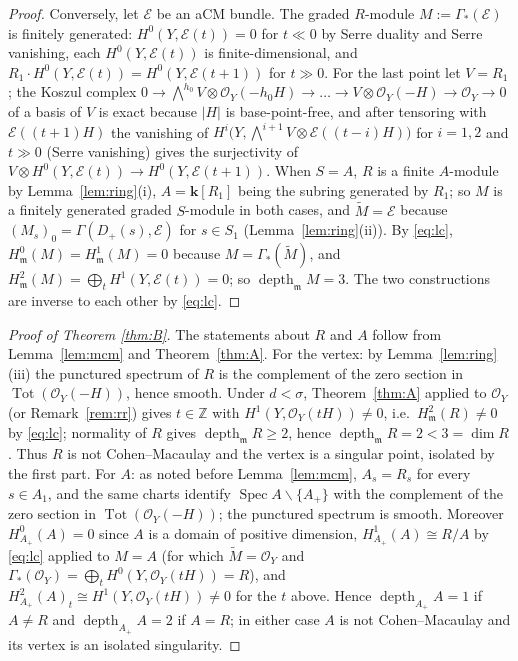 \documentclass[11pt]{amsart}
\theoremstyle{remark}
\theoremstyle{definition}
\newcommand{\ZZ}{\mathbb{Z}}
\newcommand{\bk}{\mathbf{k}}
\newcommand{\cO}{\mathcal{O}}
\newcommand{\cE}{\mathcal{E}}
\DeclareMathOperator{\depth}{depth}
\DeclareMathOperator{\Spec}{Spec}
\DeclareMathOperator{\Tot}{Tot}
\begin{document}
\begin{proof}
Conversely, let $\cE$ be an aCM bundle. The graded $R$-module $M:=\Gamma_*(\cE)$ is finitely generated: $H^0(Y,\cE(t))=0$ for $t\ll0$ by Serre duality and Serre vanishing, each $H^0(Y,\cE(t))$ is finite-dimensional, and $R_1\cdot H^0(Y,\cE(t))=H^0(Y,\cE(t+1))$ for $t\gg0$. For the last point let $V=R_1$; the Koszul complex $0\to\bigwedge^{h_0}V\otimes\cO_Y(-h_0H)\to\dots\to V\otimes\cO_Y(-H)\to\cO_Y\to0$ of a basis of $V$ is exact because $|H|$ is base-point-free, and after tensoring with $\cE((t+1)H)$ the vanishing of $H^i\bigl(Y,\bigwedge^{i+1}V\otimes\cE((t-i)H)\bigr)$ for $i=1,2$ and $t\gg0$ (Serre vanishing) gives the surjectivity of $V\otimes H^0(Y,\cE(t))\to H^0(Y,\cE(t+1))$. When $S=A$, $R$ is a finite $A$-module by Lemma~\ref{lem:ring}(i), $A=\bk[R_1]$ being the subring generated by $R_1$; so $M$ is a finitely generated graded $S$-module in both cases, and $\widetilde M=\cE$ because $(M_s)_0=\Gamma(D_+(s),\cE)$ for $s\in S_1$ (Lemma~\ref{lem:ring}(ii)). By \eqref{eq:lc}, $H^0_{\mathfrak m}(M)=H^1_{\mathfrak m}(M)=0$ because $M=\Gamma_*(\widetilde M)$, and $H^2_{\mathfrak m}(M)=\bigoplus_tH^1(Y,\cE(t))=0$; so $\depth_{\mathfrak m}M=3$. The two constructions are inverse to each other by \eqref{eq:lc}.
\end{proof}

\begin{proof}[Proof of Theorem \ref{thm:B}]
The statements about $R$ and $A$ follow from Lemma~\ref{lem:mcm} and Theorem~\ref{thm:A}. For the vertex: by Lemma~\ref{lem:ring}(iii) the punctured spectrum of $R$ is the complement of the zero section in $\Tot(\cO_Y(-H))$, hence smooth. Under $d<\sigma$, Theorem~\ref{thm:A} applied to $\cO_Y$ (or Remark~\ref{rem:rr}) gives $t\in\ZZ$ with $H^1(Y,\cO_Y(tH))\ne0$, i.e.\ $H^2_{\mathfrak m}(R)\ne0$ by \eqref{eq:lc}; normality of $R$ gives $\depth_{\mathfrak m}R\ge2$, hence $\depth_{\mathfrak m}R=2<3=\dim R$. Thus $R$ is not Cohen--Macaulay and the vertex is a singular point, isolated by the first part. For $A$: as noted before Lemma~\ref{lem:mcm}, $A_s=R_s$ for every $s\in A_1$, and the same charts identify $\Spec A\smallsetminus\{A_+\}$ with the complement of the zero section in $\Tot(\cO_Y(-H))$; the punctured spectrum is smooth. Moreover $H^0_{A_+}(A)=0$ since $A$ is a domain of positive dimension, $H^1_{A_+}(A)\cong R/A$ by \eqref{eq:lc} applied to $M=A$ (for which $\widetilde M=\cO_Y$ and $\Gamma_*(\cO_Y)=\bigoplus_tH^0(Y,\cO_Y(tH))=R$), and $H^2_{A_+}(A)_t\cong H^1(Y,\cO_Y(tH))\ne0$ for the $t$ above. Hence $\depth_{A_+}A=1$ if $A\ne R$ and $\depth_{A_+}A=2$ if $A=R$; in either case $A$ is not Cohen--Macaulay and its vertex is an isolated singularity.
\end{proof}
\end{document}
